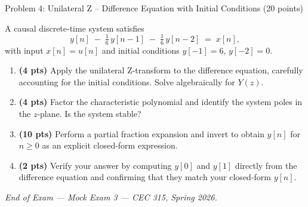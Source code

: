 \documentclass[11pt]{article}
\begin{document}
\newpage

\begin{problembox}{Problem 4: Unilateral Z -- Difference Equation with Initial Conditions \hfill (20 points)}
\end{problembox}

\vspace{4pt}
A causal discrete-time system satisfies
\[
y[n] \;-\; \tfrac{1}{6}\,y[n-1] \;-\; \tfrac{1}{6}\,y[n-2] \;=\; x[n],
\]
with input $x[n] = u[n]$ and initial conditions $y[-1] = 6$, $y[-2] = 0$.
\begin{enumerate}[label=(\alph*)]
    \item \textbf{(4 pts)} Apply the unilateral Z-transform to the difference equation, carefully accounting for the initial conditions. Solve algebraically for $Y(z)$.
    \item \textbf{(4 pts)} Factor the characteristic polynomial and identify the system poles in the $z$-plane. Is the system stable?
    \item \textbf{(10 pts)} Perform a partial fraction expansion and invert to obtain $y[n]$ for $n \ge 0$ as an explicit closed-form expression.
    \item \textbf{(2 pts)} Verify your answer by computing $y[0]$ and $y[1]$ directly from the difference equation and confirming that they match your closed-form $y[n]$.
\end{enumerate}

\vfill
\begin{center}
    \textit{End of Exam --- Mock Exam 3 --- CEC 315, Spring 2026.}
\end{center}
\end{document}
